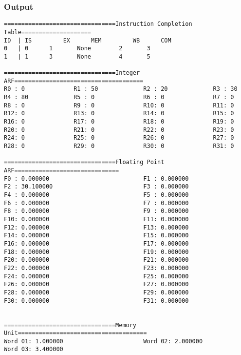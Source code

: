 \documentclass[12pt]{article}
\begin{document}
\subsubsection*{Output}
\begin{verbatim}
================================Instruction Completion Table====================
ID	| IS		 EX		 MEM		 WB		 COM
0	| 0		 1		 None		 2		 3
1	| 1		 3		 None		 4		 5

================================Integer ARF=====================================
R0 : 0              R1 : 50             R2 : 20             R3 : 30             
R4 : 80             R5 : 0              R6 : 0              R7 : 0              
R8 : 0              R9 : 0              R10: 0              R11: 0              
R12: 0              R13: 0              R14: 0              R15: 0              
R16: 0              R17: 0              R18: 0              R19: 0              
R20: 0              R21: 0              R22: 0              R23: 0              
R24: 0              R25: 0              R26: 0              R27: 0              
R28: 0              R29: 0              R30: 0              R31: 0              

================================Floating Point ARF==============================
F0 : 0.000000                           F1 : 0.000000                           
F2 : 30.100000                          F3 : 0.000000                           
F4 : 0.000000                           F5 : 0.000000                           
F6 : 0.000000                           F7 : 0.000000                           
F8 : 0.000000                           F9 : 0.000000                           
F10: 0.000000                           F11: 0.000000                           
F12: 0.000000                           F13: 0.000000                           
F14: 0.000000                           F15: 0.000000                           
F16: 0.000000                           F17: 0.000000                           
F18: 0.000000                           F19: 0.000000                           
F20: 0.000000                           F21: 0.000000                           
F22: 0.000000                           F23: 0.000000                           
F24: 0.000000                           F25: 0.000000                           
F26: 0.000000                           F27: 0.000000                           
F28: 0.000000                           F29: 0.000000                           
F30: 0.000000                           F31: 0.000000                           


================================Memory Unit=====================================
Word 01: 1.000000                       Word 02: 2.000000                       
Word 03: 3.400000  
\end{verbatim}
\end{document}
